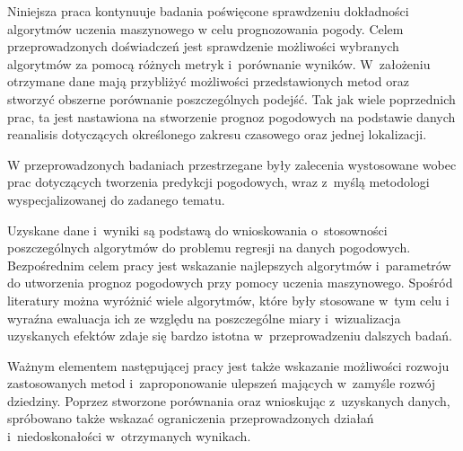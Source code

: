 Niniejsza praca kontynuuje badania poświęcone sprawdzeniu dokładności algorytmów uczenia maszynowego
w celu prognozowania pogody. Celem przeprowadzonych doświadczeń jest sprawdzenie 
możliwości wybranych algorytmów za pomocą różnych metryk i~porównanie wyników. W~założeniu
otrzymane dane mają przybliżyć możliwości przedstawionych metod oraz stworzyć obszerne porównanie
poszczególnych podejść. Tak jak wiele poprzednich prac, ta jest nastawiona na stworzenie
prognoz pogodowych na podstawie danych reanalisis dotyczących określonego zakresu czasowego oraz 
jednej lokalizacji.

W przeprowadzonych badaniach przestrzegane były zalecenia wystosowane wobec 
prac dotyczących tworzenia predykcji pogodowych, wraz z~myślą metodologi
wyspecjalizowanej do zadanego tematu.

Uzyskane dane i~wyniki są podstawą do wnioskowania o~stosowności poszczególnych algorytmów do
problemu regresji na danych pogodowych. Bezpośrednim celem pracy jest wskazanie najlepszych 
algorytmów i~parametrów do utworzenia prognoz pogodowych przy pomocy uczenia maszynowego.
Spośród literatury można wyróżnić wiele algorytmów, które były stosowane w~tym celu i~
wyraźna ewaluacja ich ze względu na poszczególne miary i~wizualizacja uzyskanych efektów zdaje się
bardzo istotna w~przeprowadzeniu dalszych badań.

Ważnym elementem następującej pracy jest także wskazanie możliwości rozwoju
zastosowanych metod i~zaproponowanie ulepszeń mających w~zamyśle rozwój dziedziny.
Poprzez stworzone porównania oraz wnioskując z~uzyskanych danych, spróbowano także wskazać
ograniczenia przeprowadzonych działań i~niedoskonałości w~otrzymanych wynikach.